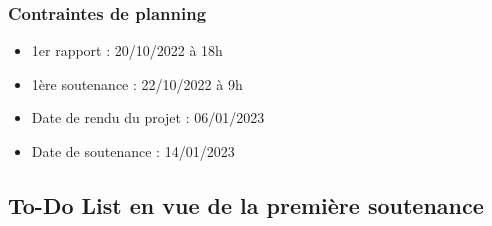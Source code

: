 \documentclass[11pt]{article}
\begin{document}
\subsubsection{Contraintes de planning}
\begin{itemize}
	\item 	1er rapport : 20/10/2022 à 18h
		\item	1ère soutenance : 22/10/2022 à 9h
		\item	Date de rendu du projet : 06/01/2023
		\item	Date de soutenance : 14/01/2023
\end{itemize}

\newpage
\subsection{To-Do List en vue de la première soutenance}
\end{document}
